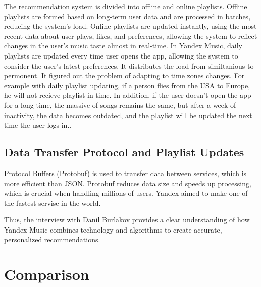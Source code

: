\documentclass[12pt,a4paper]{article}
\begin{document}
The recommendation system is divided into offline and online playlists. Offline playlists are formed based on long-term user data and are processed in batches, reducing the system’s load. Online playlists are updated instantly, using the most recent data about user plays, likes, and preferences, allowing the system to reflect changes in the user's music taste almost in real-time.
In Yandex Music, daily playlists are updated every time user opens the app, allowing the system to consider the user’s latest preferences. It distributes the load from similtanious to permonent. It figured out the problem of adapting to time zones changes. For example with daily playlist updating, if a person flies from the USA to Europe, he will not recieve playlist in time. In addition, if the user doesn't open the app for a long time, the massive of songs remains the same, but after a week of inactivity, the data becomes outdated, and the playlist will be updated the next time the user logs in.\citep{lel}\citep{lol}.

\subsection{Data Transfer Protocol and Playlist Updates}

Protocol Buffers (Protobuf) is used to transfer data between services, which is more efficient than JSON. Protobuf reduces data size and speeds up processing, which is crucial when handling millions of users. Yandex aimed to make one of the fastest servise in the world.

Thus, the interview with Danil Burlakov provides a clear understanding of how Yandex Music combines technology and algorithms to create accurate, personalized recommendations.

\section{Comparison}
\end{document}
